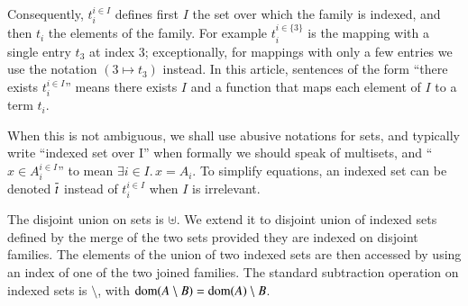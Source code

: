 \documentclass{elsarticle}
\begin{document}
Consequently, $t_i^{i\in I}$ defines first $I$ the set over which the
family is indexed, and then $t_i$ the elements of the family.
For example $t_i^{i\in\{3\}}$ is
the mapping with a single entry $t_3$ at index $3$; exceptionally, for mappings with
only a few entries we use the notation $(3\mapsto t_3)$ instead.
In this article, sentences of the form ``there exists $t_i^{i\in I}$'' means there exists $I$ and a function that maps each element of $I$ to a term $t_i$.

When this is not ambiguous, we shall use abusive notations 
for sets, and typically write ``indexed set over I'' when  
formally we should speak of multisets, and ``$x\in
A_i^{i\in I}$'' to mean $\exists i\in I.\, x=A_i$.
To simplify equations, an indexed set can be denoted $\overline{t}$
instead of $t_i^{i\in I}$ when $I$ is irrelevant.

The disjoint union on sets is $\uplus$. We extend it to  disjoint union  of indexed 
sets defined by the merge of the 
two sets provided they are indexed on disjoint families.
The elements
of the union of two indexed sets are then accessed by using an index of one of the two
joined families.
The standard subtraction operation on indexed sets is $\setminus$, with $\operatorname{dom}(A\setminus B)=\operatorname{dom}(A)\setminus B$.

\end{document}
